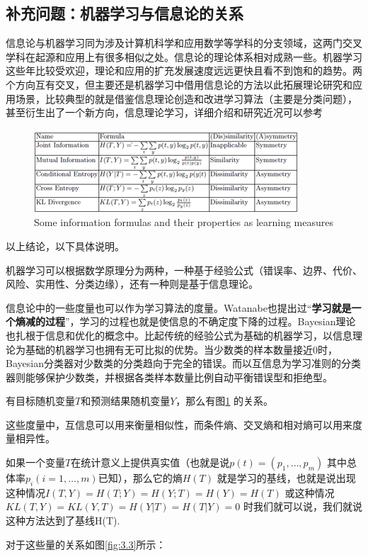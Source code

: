 \documentclass[11pt,fleqn, UTF8]{ctexbook} %
\begin{document}
\subsection{补充问题：机器学习与信息论的关系}
信息论与机器学习同为涉及计算机科学和应用数学等学科的分支领域，这两门交叉学科在起源和应用上有很多相似之处。信息论的理论体系相对成熟一些。机器学习这些年比较受欢迎，理论和应用的扩充发展速度远远更快且看不到饱和的趋势。两个方向互有交叉，但主要还是机器学习中借用信息论的方法以此拓展理论研究和应用场景，比较典型的就是借鉴信息理论创造和改进学习算法（主要是分类问题），甚至衍生出了一个新方向，信息理论学习，详细介绍和研究近况可以参考\cite{principe2000information}
\begin{figure}[b]
 \centering
 \includegraphics{pics/32.png}
 \caption{Some information formulas and their properties as learning measures}
 \label{fig:3.2}
\end{figure}

以上结论，以下具体说明。

机器学习可以根据数学原理分为两种，一种基于经验公式（错误率、边界、代价、风险、实用性、分类边缘），还有一种则是基于信息理论。

信息论中的一些度量也可以作为学习算法的度量。Watanabe也提出过“\textbf{学习就是一个熵减的过程}”，学习的过程也就是使信息的不确定度下降的过程。Bayesian理论也扎根于信息和优化的概念中。比起传统的经验公式为基础的机器学习，以信息理论为基础的机器学习也拥有无可比拟的优势。当少数类的样本数量接近0时，Bayesian分类器对少数类的分类趋向于完全的错误。而以互信息为学习准则的分类器则能够保护少数类，并根据各类样本数量比例自动平衡错误型和拒绝型。


有目标随机变量$T$和预测结果随机变量$Y$，那么有图\ref{fig:3.2} 的关系。


这些度量中，互信息可以用来衡量相似性，而条件熵、交叉熵和相对熵可以用来度量相异性。

如果一个变量$T$在统计意义上提供真实值（也就是说$p(t)=(p_1,\dots,p_m)$ 其中总体率$p_i(i=1,\dots,m)$已知），那么它的熵$H(T)$ 就是学习的基线，也就是说出现这种情况$I(T,Y)=H(T;Y)=H(Y;T)=H(Y)=H(T)$ 或这种情况$KL(T,Y)=KL(Y,T)=H(Y|T)=H(T|Y)=0$ 时我们就可以说，我们就说这种方法达到了基线H(T).


对于这些量的关系如图\ref{fig:3.3}所示：
\end{document}
